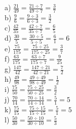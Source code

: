 \documentclass{article}
\begin{document}
\subsection*{}
a) $\frac{21}{49}=\frac{21\div7}{49\div7}=\frac{3}{7}$\\ 
\vspace{10 mm}
b) $\frac{9}{6}=\frac{9\div3}{6\div3}=\frac{3}{2}$\\ 
\vspace{10 mm}
c) $\frac{42}{35}=\frac{42\div7}{35\div7}=\frac{6}{5}$\\ 
\vspace{10 mm}
d) $\frac{30}{5}=\frac{30\div5}{5\div5}=\frac{6}{1}=6$\\ 
\vspace{10 mm}
e) $\frac{75}{175}=\frac{75\div25}{175\div25}=\frac{3}{7}$\\ 
\vspace{10 mm}
f) $\frac{63}{175}=\frac{63\div7}{175\div7}=\frac{9}{25}$\\ 
\vspace{10 mm}
g) $\frac{147}{42}=\frac{147\div21}{42\div21}=\frac{7}{2}$\\ 
\vspace{10 mm}
h) $\frac{49}{98}=\frac{49\div49}{98\div49}=\frac{1}{2}$\\ 
\vspace{10 mm}
i) $\frac{75}{50}=\frac{75\div25}{50\div25}=\frac{3}{2}$\\ 
\vspace{10 mm}
j) $\frac{70}{14}=\frac{70\div14}{14\div14}=\frac{5}{1}=5$\\ 
\vspace{10 mm}
k) $\frac{75}{15}=\frac{75\div15}{15\div15}=\frac{5}{1}=5$\\ 
\vspace{10 mm}
l) $\frac{50}{30}=\frac{50\div10}{30\div10}=\frac{5}{3}$\\ 
\vspace{10 mm}
\end{document}
